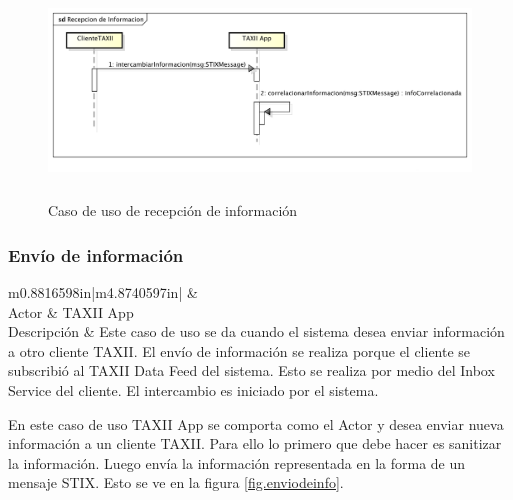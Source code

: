 \begin{figure}[H]
	\centering
	\includegraphics[width=5.7638in,height=2.2256in]{Analisis22-img/Analisis22-img028.png} 
	\caption{Caso de uso de recepción de información}
	\label{fig.recepcioninfo}
\end{figure}

\subsubsection{Envío de información}
\begin{flushleft}
	\tablefirsthead{}
	\tablehead{}
	\tabletail{}
	\tablelasttail{}
	\begin{supertabular}{m{0.8816598in}|m{4.8740597in}|}
		 &
		\\\hline
		{Actor} &
		{TAXII App}\\
		{Descripción} &
		{Este caso de uso se da cuando el sistema desea enviar información a otro cliente
			TAXII. El envío de información se realiza porque el cliente se subscribió al TAXII Data Feed del sistema. Esto se
			realiza por medio del Inbox Service del cliente. El intercambio es iniciado por el sistema.}\\\hhline{~-}
	\end{supertabular}
\end{flushleft}
\bigskip
	En este caso de uso TAXII App se comporta como el Actor y desea enviar nueva información a un cliente TAXII. Para ello
	lo primero que debe hacer es sanitizar la información. Luego envía la información representada en la forma de un
	mensaje STIX. Esto se ve en la figura \ref{fig.enviodeinfo}.
	
